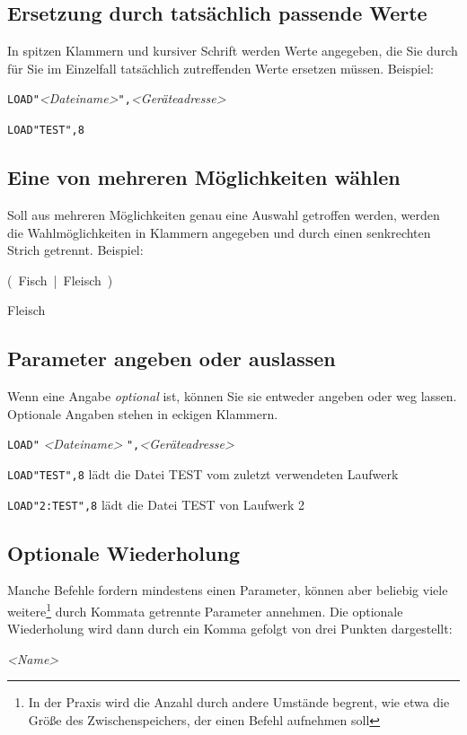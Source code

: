 \documentclass[10pt,a4paper]{scrartcl}		%
\begin{document}
\subsection*{Ersetzung durch tatsächlich passende Werte}
In spitzen Klammern und kursiver Schrift werden Werte angegeben, die 
Sie durch für Sie im Einzelfall tatsächlich
zutreffenden Werte ersetzen müssen. Beispiel:

\texttt{LOAD"}\textit{<Dateiname>}\texttt{",}\textit{<Geräteadresse>}

\texttt{LOAD"TEST",8}

\subsection*{Eine von mehreren Möglichkeiten wählen}
Soll aus mehreren Möglichkeiten genau eine Auswahl getroffen werden,
werden die Wahlmöglichkeiten in Klammern angegeben und durch einen
senkrechten Strich getrennt. Beispiel:

\mbox{\Big( Fisch \Big| \normalsize Fleisch \Big) \normalsize} 

Fleisch

\subsection*{Parameter angeben oder auslassen}
Wenn eine Angabe \textit{optional} ist, können Sie sie entweder
angeben oder weg lassen. Optionale Angaben stehen in eckigen Klammern.

\texttt{LOAD"}  \textit{<Dateiname>}
\texttt{",}\textit{<Geräteadresse>}

\texttt{LOAD"TEST",8} lädt die Datei TEST vom zuletzt 
verwendeten Laufwerk

\texttt{LOAD"2:TEST",8} lädt die Datei TEST von Laufwerk 2

\subsection*{Optionale Wiederholung}
Manche Befehle fordern mindestens einen Parameter, können aber beliebig
viele weitere\footnote{
	In der Praxis wird die Anzahl durch andere Umstände begrent, 
	wie etwa die Größe des Zwischenspeichers, der einen Befehl
	aufnehmen soll
} durch Kommata getrennte Parameter annehmen. Die optionale Wiederholung
wird dann durch ein Komma gefolgt von drei Punkten dargestellt:

\mbox{\textit{<Name>} \Big[ \texttt{,} \ldots \ \Big]}
\end{document}
